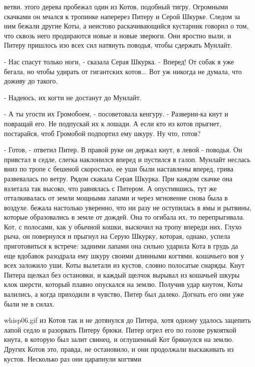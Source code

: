 ветви.
 этого дерева пробежал один из Котов, подобный тигру. 
Огромными скачками он мчался к тропинке наперерез Питеру и Серой 
Шкурке. Следом за ним бежали другие Коты, а неистово раскачивающийся 
кустарник говорил о том, что сквозь него продираются новые и новые 
зверюги. Они яростно выли, и Питеру пришлось изо всех сил натянуть 
поводья, чтобы сдержать Мунлайт.
\par- Нас спасут только ноги, - сказала Серая Шкурка. - Вперед! От 
собак я уже бегала, но чтобы удирать от гигантских котов... Вот уж 
никогда не думала, что доживу до такого.
\par- Надеюсь, их когти не достанут до Мунлайт.
\par- А ты угости их Громобоем, - посоветовала кенгуру. - Разверни-ка 
кнут и повращай его. Не подпускай их к лошади. А если кто из котов 
прыгнет, постарайся, чтоб Громобой подпортил ему шкуру. Ну что, готов?
\par- Готов, - ответил Питер. В правой руке он держал кнут, в левой - 
поводья. Он привстал в седле, слегка наклонился вперед и пустился в 
галоп. Мунлайт неслась вниз по тропе с бешеной скоростью, ее уши были 
наставлены вперед, грива развевалась по ветру. Рядом скакала Серая 
Шкурка. При каждом скачке она взлетала так высоко, что равнялась с 
Питером. А опустившись, тут же отталкивалась от земли мощными лапами и 
через мгновение снова была в воздухе.
 бежала настолько уверенно, что ни разу не оступилась в ямы 
и рытвины, которые образовались в земле от дождей. Она то огибала их, 
то перепрыгивала.
 Кот, с полосами, как у обычной кошки, выскочил на тропу 
впереди них. Глухо рыча, он повернулся и прыгнул на Серую Шкурку, 
которая, однако, успела приготовиться к встрече: задними лапами она 
сильно ударила Кота в грудь да еще вдобавок разодрала ему шкуру своими 
длинными когтями.
 кошачьего воя у всех заложило уши. Коты вылетали из кустов, 
словно полосатые снаряды. Кнут Питера щелкал без остановки, и каждый 
щелчок вырывал из кошачьей шкуры клок шерсти, который плавно опускался 
на землю. Получив удар кнутом, Коты валились, а когда приходили в 
чувство, Питер был далеко. Догнать его они уже были не в силах.
\par{whisp06.gif}
 из Котов так и не дотянулся до Питера, хотя одному удалось 
зацепить лапой седло и разорвать Питеру брюки. Питер огрел его по 
голове рукояткой кнута, в которую был залит свинец, и оглушенный Кот 
брякнулся на землю. Других Котов это, правда, не остановило, и они 
продолжали выскакивать из кустов. Несколько раз они царапнули когтями 
